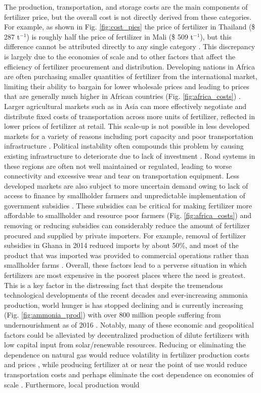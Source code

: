 The production, transportation, and storage costs are the main components of fertilizer price, but the overall cost is not directly derived from these categories. For example, as shown in Fig. \ref{fig:cost_pies} the price of fertilizer in Thailand (\$ 287 t$^{-1}$) is roughly half the price of fertilizer in Mali (\$ 509 t$^{-1}$), but this difference cannot be attributed directly to any single category \cite{Wanzala2013}. This discrepancy is largely due to the economies of scale and to other factors that affect the efficiency of fertilizer procurement and distribution. Developing nations in Africa are often purchasing smaller quantities of fertilizer from the international market, limiting their ability to bargain for lower wholesale prices and leading to prices that are generally much higher in African countries (Fig. \ref{fig:africa_costs}) \cite{Wanzala2013}. Larger agricultural markets such as in Asia can more effectively negotiate and distribute fixed costs of transportation across more units of fertilizer, reflected in lower prices of fertilizer at retail. This scale-up is not possible in less developed markets for a variety of reasons including port capacity and poor transportation infrastructure \cite{Chianu_2011}. Political instability often compounds this problem by causing existing infrastructure to deteriorate due to lack of investment \cite{IFDC_2012, IFDC_2012_2, IFDC_2012_3}. Road systems in these regions are often not well maintained or regulated, leading to worse connectivity and excessive wear and tear on transportation equipment. Less developed markets are also subject to more uncertain demand owing to lack of access to finance by smallholder farmers and unpredictable implementation of government subsidies \cite{Chianu_2011,IFDC_2012, IFDC_2011, IFDC_2012_2, IFDC_2012_3}. These subsidies can be critical for making fertilizer more affordable to smallholder and resource poor farmers  (Fig. \ref{fig:africa_costs}) and removing or reducing subsidies can considerably reduce the amount of fertilizer procured and supplied by private importers. For example, removal of fertilizer subsidies in Ghana in 2014 reduced imports by about 50\%, and most of the product that was imported was provided to commercial operations rather than smallholder farms \cite{IFDC_2018}. Overall, these factors lead to a perverse situation in which fertilizers are most expensive in the poorest places where the need is greatest. This is a key factor in the distressing fact that despite the tremendous technological developments of the recent decades and ever-increasing ammonia production, world hunger is has stopped declining and is currently increasing (Fig. \ref{fig:ammonia_prod}) with over 800 million people suffering from undernourishment as of 2016 \cite{FAO_2017}. Notably, many of these economic and geopolitical factors could be alleviated by decentralized production of dilute fertilizers with low capital input from solar/renewable resources. Reducing or eliminating the dependence on natural gas would reduce volatility in fertilizer production costs and prices \cite{Etienne2016}, while producing fertilizer at or near the point of use would reduce transportation costs and perhaps eliminate the cost dependence on economies of scale  \cite{IFDC_1998}. Furthermore, local production would 